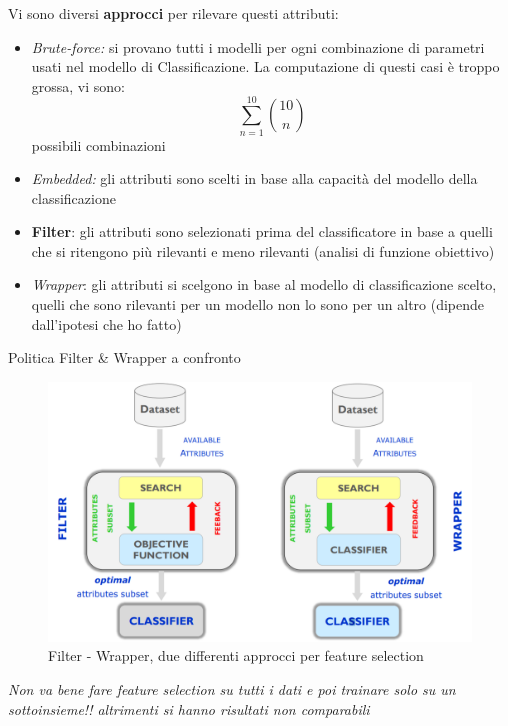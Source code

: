 Vi sono diversi \textbf{approcci} per rilevare questi attributi:
\begin{itemize}
	\item \textit{Brute-force:} si provano tutti i modelli per ogni combinazione di parametri usati nel modello di Classificazione. La computazione di questi casi è troppo grossa, vi sono: \[\sum_{n=1}^{10}\binom{10}{n}\] possibili combinazioni
	\item \textit{Embedded:} gli attributi sono scelti in base alla capacità del modello della classificazione
	\item \textbf{Filter}: gli attributi sono selezionati prima del classificatore in base a quelli che si ritengono più rilevanti e meno rilevanti (analisi di funzione obiettivo)
	\item \textit{Wrapper}: gli attributi si scelgono in base al modello di classificazione scelto, quelli che sono rilevanti per un modello non lo sono per un altro (dipende dall'ipotesi che ho fatto)
\end{itemize}
Politica Filter \& Wrapper a confronto
\begin{figure}[H]
	\centering
	\includegraphics[height=0.5 \linewidth]{classification/pict/filter_wrapper.png}
	\caption{Filter - Wrapper, due differenti approcci per feature selection}
\end{figure}
\textit{Non va bene fare feature selection su tutti i dati e poi trainare solo su un sottoinsieme!! altrimenti si hanno risultati non comparabili}

